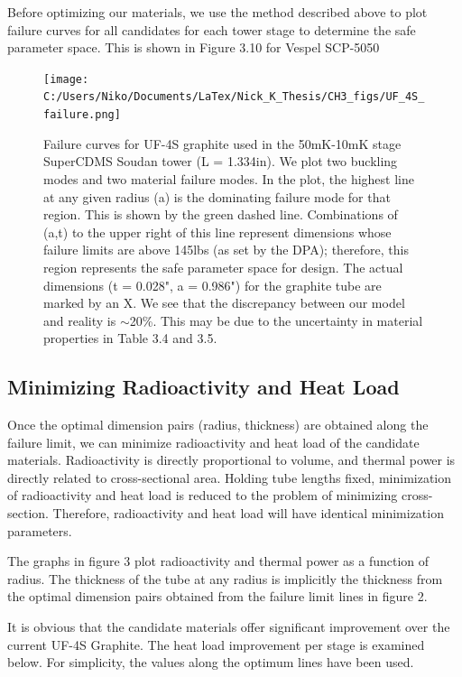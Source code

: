 \documentclass{report}
\begin{document}
Before optimizing our materials, we use the method described above to plot failure curves for all candidates for each tower stage to determine the safe parameter space. This is shown in Figure 3.10 for Vespel SCP-5050
\begin{figure}[ht]
\centering
\texttt{[image: C:/Users/Niko/Documents/LaTex/Nick\_K\_Thesis/CH3\_figs/UF\_4S\_failure.png]}
\caption{Failure curves for UF-4S graphite used in the 50mK-10mK stage SuperCDMS Soudan tower (L = 1.334in). We plot two buckling modes and two material failure modes. In the plot, the highest line at any given radius (a) is the dominating failure mode for that region. This is shown by the green dashed line. Combinations of (a,t) to the upper right of this line represent dimensions whose failure limits are above 145lbs (as set by the DPA); therefore, this region represents the safe parameter space for design. The actual dimensions (t = 0.028", a = 0.986") for the graphite tube are marked by an X. We see that the discrepancy between our model and reality is $\sim$20\%. This may be due to the uncertainty in material properties in Table 3.4 and 3.5.}
\end{figure}


\subsection{Minimizing Radioactivity and Heat Load}

Once the optimal dimension pairs (radius, thickness) are obtained along the failure limit, we can minimize radioactivity and heat load of the candidate materials. Radioactivity is
directly proportional to volume, and thermal power is directly related to cross-sectional area. Holding tube lengths fixed, minimization of radioactivity and heat load is reduced
to the problem of minimizing cross-section. Therefore, radioactivity and heat load will have identical minimization parameters.

The graphs in figure 3 plot radioactivity and thermal power as a function of radius. The thickness of the tube at any radius is implicitly the thickness from the optimal dimension
pairs obtained from the failure limit lines in figure 2.

It is obvious that the candidate materials offer significant improvement over the current UF-4S Graphite. The heat load improvement per stage is examined below. For simplicity,
the values along the optimum lines have been used.

\smallskip
\end{document}
